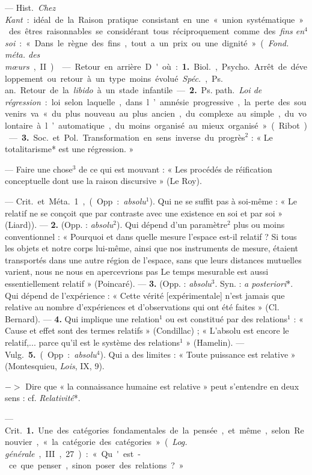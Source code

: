 \begin{itemize}[leftmargin=1cm, label=, itemsep=1pt]
 — \si{Hist.} {\it Chez Kant} : idéal de la Raison
pratique consistant en une « union systématique » des êtres raisonnables se
considérant tous réciproquement comme des {\it fins en$^4$ soi} : « Dans le
règne des fins, tout a un prix ou une dignité » ({\it Fond. méta. des mœurs},
II).

 — Retour en arrière. D'où : {\bf 1.} \si{Biol.}, \si{Psycho.}
Arrêt de développement ou retour à un type moins évolué. {\it Spéc.},
\si{Ps. an.} Retour de la {\it libido} à un stade infantile. — {\bf 2.}
\si{Ps. path.} {\it Loi de régression} : loi selon laquelle, dans l’amnésie
progressive, la perte des souvenirs va « du plus nouveau au plus ancien, du
complexe au simple, du volontaire à l’automatique, du moins organisé au mieux
organisé » (Ribot). — {\bf 3.} \si{Soc.} et \si{Pol.} Transformation en sens
inverse du progrès$^2$ : « Le totalitarisme* est une régression. »

 — Faire une chose$^3$ de ce qui est mouvant : « Les procédés de
réification conceptuelle dont use la raison discursive » (Le Roy).

 — \si{Crit.} et \si{Méta.} 1, (Opp. : {\it absolu}$^1$). Qui ne
se suffit pas à soi-même : « Le relatif ne se conçoit que par contraste avec
une existence en soi et par soi » (Liard)). — {\bf 2.} (Opp. :
{\it absolu}$^2$). Qui dépend d'un paramètre$^2$ plus ou moins
conventionnel : « Pourquoi et dans quelle mesure l’espace est-il relatif ? Si
tous les objets et notre corps lui-même, ainsi que nos instruments de mesure,
étaient transportés dans une autre région de l'espace, sans que leurs
distances mutuelles varient, nous ne nous en apercevrions pas Le temps
mesurable est aussi essentiellement relatif » (Poincaré). — {\bf 3.} (Opp. :
{\it absolu}$^3$. Syn. : {\it a posteriori}*. Qui dépend de l'expérience : «
Cette vérité [expérimentale] n’est jamais que relative au nombre
d’expériences et d'observations qui ont été faites » (Cl. Bernard). —
{\bf 4.} Qui implique une relation$^1$ ou est constitué par des
relations$^1$ : « Cause et effet sont des termes relatifs » (Condillac) ; «
L’absolu est encore le relatif,... parce qu'il est le système des
relations$^1$ » (Hamelin). — \si{Vulg.} {\bf 5.} (Opp. : {\it absolu}$^4$).
Qui a des limites : « Toute puissance est relative » (Montesquieu, {\it
Lois}, IX, 9).

$->$ Dire que « la connaissance
humaine est relative » peut s’entendre en deux sens : cf. {\it Relativité}*.

 — \si{Crit.} {\bf 1.} Une des catégories fondamentales de la
pensée, et même, selon Renouvier, « la catégorie des catégories » ({\it Log.
générale}, III, 27) : « Qu'est-ce que penser, sinon poser des relations ? »


\end{itemize}
